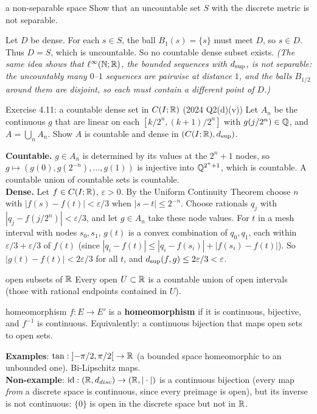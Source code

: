 \begin{exam}{a non-separable space}
Show that an uncountable set $S$ with the discrete metric is not separable.
\end{exam}
\begin{answer}
Let $D$ be dense. For each $s\in S$, the ball $B_1(s)=\{s\}$ must meet $D$, so $s\in D$. Thus
$D=S$, which is uncountable. So no countable dense subset exists.
\emph{(The same idea shows that $\ell^\infty(\mathbb N;\mathbb R)$, the bounded sequences with $d_{\sup}$, is not
separable: the uncountably many $0$--$1$ sequences are pairwise at distance $1$, and the balls
$B_{1/2}$ around them are disjoint, so each must contain a different point of $D$.)}
\end{answer}

\begin{exam}{Exercise 4.11: a countable dense set in $C(I;\mathbb R)$ (2024 Q2(d)(v))}
Let $A_n$ be the continuous $g$ that are linear on each $[k/2^n,(k+1)/2^n]$ with
$g(j/2^n)\in\mathbb Q$, and $A=\bigcup_n A_n$. Show $A$ is countable and dense in $(C(I;\mathbb R),d_{\sup})$.
\end{exam}
\begin{answer}
\textbf{Countable.} $g\in A_n$ is determined by its values at the $2^n+1$ nodes, so
$g\mapsto(g(0),g(2^{-n}),\dots,g(1))$ is injective into $\mathbb Q^{2^n+1}$, which is countable. A
countable union of countable sets is countable.\\
\textbf{Dense.} Let $f\in C(I;\mathbb R)$, $\varepsilon>0$. By the Uniform Continuity Theorem choose
$n$ with $|f(s)-f(t)|<\varepsilon/3$ when $|s-t|\le2^{-n}$. Choose rationals $q_j$ with
$|q_j-f(j/2^n)|<\varepsilon/3$, and let $g\in A_n$ take these node values. For $t$ in a mesh
interval with nodes $s_0,s_1$, $g(t)$ is a convex combination of $q_0,q_1$, each within
$\varepsilon/3+\varepsilon/3$ of $f(t)$ (since $|q_i-f(t)|\le|q_i-f(s_i)|+|f(s_i)-f(t)|$).
So $|g(t)-f(t)|<2\varepsilon/3$ for all $t$, and $d_{\sup}(f,g)\le2\varepsilon/3<\varepsilon$.
\end{answer}

\begin{thm}{open subsets of $\mathbb R$}
Every open $U\subset\mathbb R$ is a countable union of open intervals (those with rational endpoints
contained in $U$).
\end{thm}

\begin{defn}{homeomorphism}
$f:E\to E'$ is a \textbf{homeomorphism} if it is continuous, bijective, and $f^{-1}$ is
continuous. Equivalently: a continuous bijection that maps open sets to open sets.
\end{defn}
\textbf{Examples}: $\tan:\mathopen{]}-\pi/2,\pi/2\mathclose{[}\to\mathbb R$ (a bounded space homeomorphic to an unbounded
one). Bi-Lipschitz maps.\\
\textbf{Non-example}: $\operatorname{id}:(\mathbb R,d_{disc})\to(\mathbb R,|\cdot|)$ is a continuous bijection (every map
\emph{from} a discrete space is continuous, since every preimage is open), but its inverse is not
continuous: $\{0\}$ is open in the discrete space but not in $\mathbb R$.

